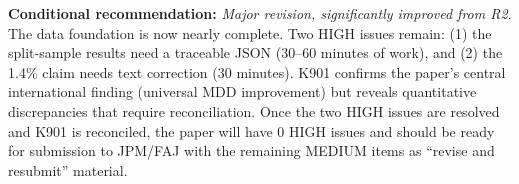 \documentclass[12pt,a4paper]{article}
\begin{document}
\bigskip

\noindent\textbf{Conditional recommendation:} \textit{Major revision, significantly improved from R2.} The data foundation is now nearly complete. Two HIGH issues remain: (1) the split-sample results need a traceable JSON (30--60 minutes of work), and (2) the 1.4\% claim needs text correction (30 minutes). K901 confirms the paper's central international finding (universal MDD improvement) but reveals quantitative discrepancies that require reconciliation. Once the two HIGH issues are resolved and K901 is reconciled, the paper will have 0 HIGH issues and should be ready for submission to JPM/FAJ with the remaining MEDIUM items as ``revise and resubmit'' material.
\end{document}
